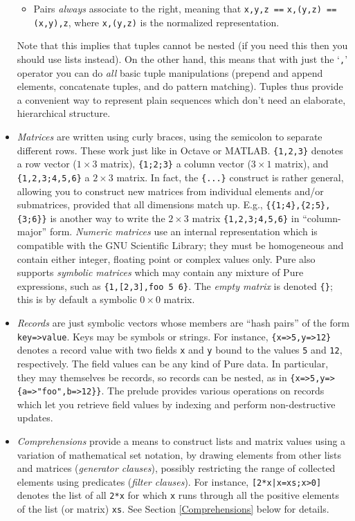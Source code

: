 \documentclass[a4paper,12pt]{article}
\begin{document}
\begin{itemize}
\begin{itemize}
\item Pairs \emph{always} associate to the right, meaning that \verb|x,y,z ==| \verb|x,(y,z) ==| \verb|(x,y),z|, where \verb|x,(y,z)| is the normalized representation.
\end{itemize}
Note that this implies that tuples cannot be nested (if you need this then you should use lists instead). On the other hand, this means that with just the `\verb|,|' operator you can do \emph{all} basic tuple manipulations (prepend and append elements, concatenate tuples, and do pattern matching). Tuples thus provide a convenient way to represent plain sequences which don't need an elaborate, hierarchical structure.
\item \emph{Matrices} are written using curly braces, using the semicolon to separate different rows. These work just like in Octave or MATLAB. \verb|{1,2,3}| denotes a row vector ($1\times 3$ matrix), \verb|{1;2;3}| a column vector ($3\times 1$ matrix), and \verb|{1,2,3;4,5,6}| a $2\times 3$ matrix. In fact, the \verb|{...}| construct is rather general, allowing you to construct new matrices from individual elements and/or submatrices, provided that all dimensions match up. E.g., \verb|{{1;4},{2;5},{3;6}}| is another way to write the $2\times 3$ matrix \verb|{1,2,3;4,5,6}| in ``col\-umn-major'' form. \emph{Numeric matrices} use an internal representation which is compatible with the GNU Scientific Library; they must be homogeneous and contain either integer, floating point or complex values only. Pure also supports \emph{symbolic matrices} which may contain any mixture of Pure expressions, such as \verb|{1,[2,3],foo 5 6}|. The \emph{empty matrix} is denoted \verb|{}|; this is by default a symbolic $0\times 0$ matrix.
\item \emph{Records} are just symbolic vectors whose members are ``hash pairs'' of the form \verb|key=>value|. Keys may be symbols or strings. For instance, \verb|{x=>5,y=>12}| denotes a record value with two fields \verb|x| and \verb|y| bound to the values \verb|5| and \verb|12|, respectively. The field values can be any kind of Pure data. In particular, they may themselves be records, so records can be nested, as in \verb|{x=>5,y=>{a=>"foo",b=>12}}|. The prelude provides various operations on records which let you retrieve field values by indexing and perform non-destructive updates.
\item \emph{Comprehensions} provide a means to construct lists and matrix values using a variation of mathematical set notation, by drawing elements from other lists and matrices (\emph{generator clauses}), possibly restricting the range of collected elements using predicates (\emph{filter clauses}). For instance, \verb?[2*x|x=xs;x>0]? denotes the list of all \verb|2*x| for which \verb|x| runs through all the positive elements of the list (or matrix) \verb|xs|. See Section \ref{Comprehensions} below for details.
\end{itemize}
\end{document}
